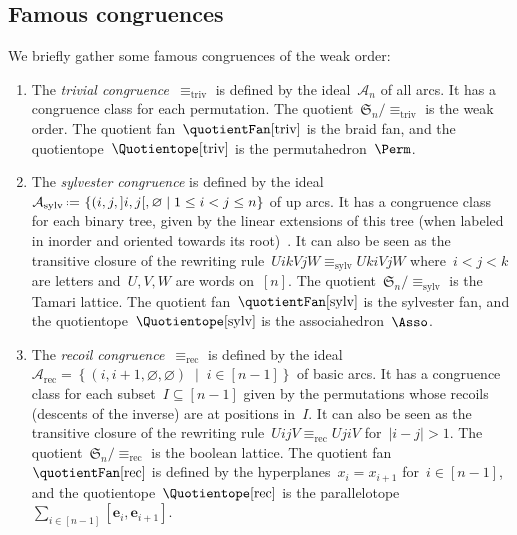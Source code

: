 \documentclass{amsart}
\theoremstyle{definition}
\newcommand{\f}[1]{{\mathfrak{#1}}} %
\renewcommand{\b}[1]{{\boldsymbol{#1}}} %
\newcommand{\set}[2]{\left\{ #1 \;\middle|\; #2 \right\}} %
\newcommand{\eqdef}{\mbox{\,\raisebox{0.2ex}{\scriptsize\ensuremath{\mathrm:}}\ensuremath{=}\,}} %
\newcommand{\darkblue}{\color{darkblue}} %
\newcommand{\defn}[1]{\textsl{\darkblue #1}} %
\newcommand{\vincent}[1]{\todo[color=blue!30]{#1 \\ \hfill --- V.}}
\newcommand{\arcs}{{\mathcal{A}}} %
\begin{document}

\subsection{Famous congruences}
\label{subsec:famousCongruences}

We briefly gather some famous congruences of the weak order:
\vincent{Not sure we need all of them}

\begin{enumerate}
\item \label{item:trivialCongruence}
The \defn{trivial congruence}~$\equiv_\textrm{triv}$ is defined by the ideal~$\arcs_n$ of all arcs.
It has a congruence class for each permutation.
The quotient~$\f{S}_n/{\equiv_\textrm{triv}}$ is the weak order.
The quotient fan~$\quotientFan[\textrm{triv}]$ is the braid fan, and the quotientope~$\Quotientope[\textrm{triv}]$ is the permutahedron~$\Perm$.

\item \label{item:sylvesterCongruence}
The \defn{sylvester congruence} is defined by the ideal~$\arcs_\textrm{sylv} \eqdef \set{(i, j, {]i,j[}, \varnothing}{1 \le i < j \le n}$ of up arcs.
It has a congruence class for each binary tree, given by the linear extensions of this tree (when labeled in inorder and oriented towards its root)~\cite{Tonks, HivertNovelliThibon-algebraBinarySearchTrees}.
It can also be seen as the transitive closure of the rewriting rule~$U i k V j W \equiv_\textrm{sylv} U k i V j W$ where~$i < j < k$ are letters and~$U,V,W$ are words on~$[n]$.
The quotient~$\f{S}_n/{\equiv_\textrm{sylv}}$ is the Tamari lattice.
The quotient fan~$\quotientFan[\textrm{sylv}]$ is the sylvester fan, and the quotientope~$\Quotientope[\textrm{sylv}]$ is the associahedron~$\Asso$.

\item \label{item:recoilCongruence}
The \defn{recoil congruence}~$\equiv_\textrm{rec}$ is defined by the ideal~$\arcs_\textrm{rec} = \set{(i, i+1, \varnothing, \varnothing)}{i \in [n-1]}$ of basic arcs.
It has a congruence class for each subset~$I \subseteq [n-1]$ given by the permutations whose recoils (descents of the inverse) are at positions in~$I$.
It can also be seen as the transitive closure of the rewriting rule~$U i j V \equiv_{\textrm{rec}} U j i V$ for~$|i - j| > 1$.
The quotient~$\f{S}_n/{\equiv_\textrm{rec}}$ is the boolean lattice.
The quotient fan~$\quotientFan[\textrm{rec}]$ is defined by the hyperplanes~$x_i = x_{i+1}$ for~$i \in [n-1]$, and the quotientope~$\Quotientope[\textrm{rec}]$ is the parallelotope~$\sum_{i \in [n-1]} [\b{e}_i, \b{e}_{i+1}]$.


\end{enumerate}
\end{document}
